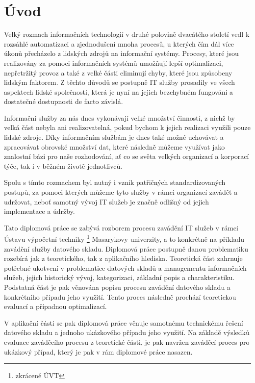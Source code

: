 \documentclass[
  digital,     %
  twoside,     %
  lof,         %
  lot,         %
]{fithesis4}
\begin{document}
\chapter{Úvod}
Velký rozmach informačních technologií v druhé polovině dvacátého století vedl k rozsáhlé automatizaci a zjednodušení mnoha procesů, u kterých čím dál více úkonů přecházelo z lidských zdrojů na informační systémy. Procesy, které jsou realizovány za pomoci informačních systémů umožňují lepší optimalizaci, nepřetržitý provoz a také z velké části eliminují chyby, které jsou způsobeny lidským faktorem. Z těchto důvodů se postupně IT služby prosadily ve všech aspektech lidské společnosti, která je nyní na jejich bezchybném fungování a dostatečné dostupnosti de facto závislá. 

Informační služby za nás dnes vykonávají velké množství činností, z nichž by velká část nebyla ani realizovatelná, pokud bychom k jejich realizaci využili pouze lidské zdroje. Díky informačním službám je dnes také možné uchovávat a zpracovávat obrovské množství dat, které následně můžeme využívat jako znalostní bázi pro naše rozhodování, ať co se světa velkých organizací a korporací týče, tak i v běžném životě jednotlivců.

Spolu s tímto rozmachem byl nutný i vznik patřičných standardizovaných postupů, za pomoci kterých můžeme tyto služby v rámci organizací zavádět a udržovat, neboť samotný vývoj IT služeb je značně odlišný od jejich implementace a údržby. 

Tato diplomová práce se zabývá rozborem procesu zavádění IT služeb v rámci Ústavu výpočetní techniky \footnote{zkráceně ÚVT} Masarykovy univerzity, a to konkrétně na příkladu zavádění služby datového skladu. Diplomová práce postupně danou problematiku rozebírá jak z teoretického, tak z aplikačního hlediska. Teoretická část zahrnuje potřebné ukotvení v problematice datových skladů a managementu informačních služeb, jejich historický vývoj, kategorizaci, základní popis a charakteristiku. Podstatná část je pak věnována popisu procesu zavádění datového skladu a konkrétního případu jeho využití. Tento proces následně prochází teoretickou evaluací a případnou optimalizací. 

V aplikační části se pak diplomová práce věnuje samotnému technickému řešení datového skladu a jednoho ukázkového případu jeho využití. Na základě výsledků evaluace zaváděcího procesu z teoretické části, je pak navržen zaváděcí proces pro ukázkový případ, který je pak v rám diplomové práce nasazen. 
\end{document}
